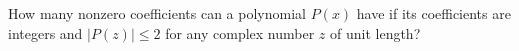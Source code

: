 How many nonzero coefficients can a polynomial \( P(x)\) have if its coefficients are integers and \( |P(z)| \le 2\) for any complex number \( z\) of unit length?